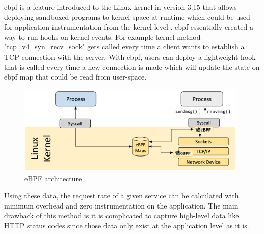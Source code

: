 \ac{ebpf} is a feature introduced to the Linux kernel in version 3.15 that allows deploying sandboxed programs to kernel space at runtime which could be used for application instrumentation from the kernel level \citep{LKMLIngo52:online}. \ac{ebpf} essentially created a way to run hooks on kernel events. For example kernel method "tcp\_v4\_syn\_recv\_sock" gets called every time a client wants to establish a TCP connection with the server. With \ac{ebpf}, users can deploy a lightweight hook that is called every time a new connection is made which will update the state on \ac{ebpf} map that could be read from user-space. 

\begin{figure}[H]
    \includegraphics[width=11cm]{assets/literature-review/ebpf-architecture.png}
    \caption{eBPF architecture \citep{WhatiseB46:online}}
    \label{fig:ebpf-architecture}
\end{figure}

Using these data, the request rate of a given service can be calculated with minimum overhead and zero instrumentation on the application. The main drawback of this method is it is complicated to capture high-level data like HTTP status codes since those data only exist at the application level as it is.

